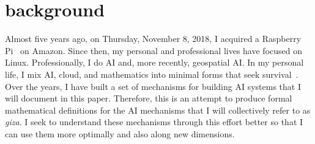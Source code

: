 \section*{background}

Almost five years ago, on Thursday, November 8, 2018, I acquired a Raspberry Pi~ on Amazon. Since then, my personal and professional lives have focused on Linux. Professionally, I do AI and, more recently, geospatial AI. In my personal life, I mix AI, cloud, and mathematics into minimal forms that seek survival~. Over the years, I have built a set of mechanisms for building AI systems that I will document in this paper. Therefore, this is an attempt to produce formal mathematical definitions for the AI mechanisms that I will collectively refer to as \emph{giza}. I seek to understand these mechanisms through this effort better so that I can use them more optimally and also along new dimensions.   